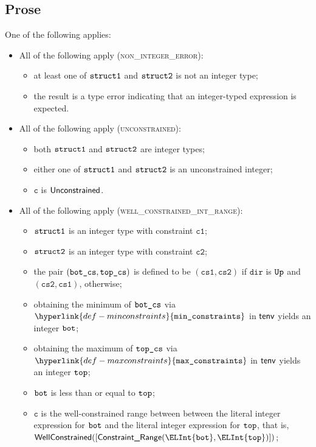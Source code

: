 \documentclass{book}
\newcommand\minconstraints[0]{\hyperlink{def-minconstraints}{\texttt{min\_constraints}}}
\newcommand\maxconstraints[0]{\hyperlink{def-maxconstraints}{\texttt{max\_constraints}}}
\newcommand\vc[0]{\texttt{c}}
\newcommand\vcone[0]{\texttt{c1}}
\newcommand\vctwo[0]{\texttt{c2}}
\newcommand\dir[0]{\texttt{dir}}
\newcommand\csone[0]{\texttt{cs1}}
\newcommand\cstwo[0]{\texttt{cs2}}
\begin{document}
\subsection{Prose}
One of the following applies:
\begin{itemize}
  \item All of the following apply (\textsc{non\_integer\_error}):
  \begin{itemize}
    \item at least one of $\texttt{struct1}$ and $\texttt{struct2}$ is not an integer type;
    \item the result is a type error indicating that an integer-typed expression is expected.
  \end{itemize}

  \item All of the following apply (\textsc{unconstrained}):
  \begin{itemize}
    \item both $\texttt{struct1}$ and $\texttt{struct2}$ are integer types;
    \item either one of $\texttt{struct1}$ and $\texttt{struct2}$ is an unconstrained integer;
    \item $\vc$ is $\textsf{Unconstrained}$.
  \end{itemize}

  \item All of the following apply (\textsc{well\_constrained\_int\_range}):
  \begin{itemize}
    \item $\texttt{struct1}$ is an integer type with constraint $\vcone$;
    \item $\texttt{struct2}$ is an integer type with constraint $\vctwo$;
    \item the pair $(\texttt{bot\_cs}, \texttt{top\_cs})$ is defined to be $(\csone, \cstwo)$ if $\dir$ is $\texttt{Up}$ and $(\cstwo, \csone)$, otherwise;
    \item obtaining the minimum of $\texttt{bot\_cs}$ via $\minconstraints$ in $\textsf{tenv}$ yields an integer $\texttt{bot}$;
    \item obtaining the maximum of $\texttt{top\_cs}$ via $\maxconstraints$ in $\textsf{tenv}$ yields an integer $\texttt{top}$;
    \item $\texttt{bot}$ is less than or equal to $\texttt{top}$;
    \item $\vc$ is the well-constrained range between between the literal integer expression for $\texttt{bot}$ and
          the literal integer expression for $\texttt{top}$, that is, \\
          $\wellconstrained([\ConstraintRange(\ELInt{\vbot}, \ELInt{\vvtop})])$;
  \end{itemize}


\end{itemize}
\end{document}

